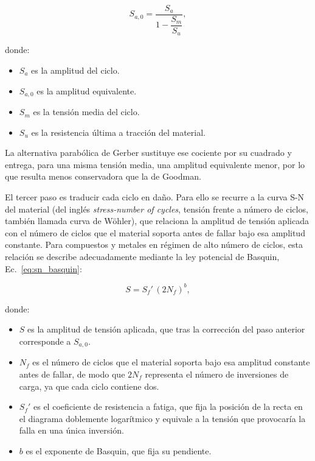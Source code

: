 \begin{equation}
S_{a,0} = \frac{S_a}{1 - \dfrac{S_m}{S_u}},
\label{eq:goodman}
\end{equation}

donde:
\begin{itemize}
    \item $S_a$ es la amplitud del ciclo.
    \item $S_{a,0}$ es la amplitud equivalente.
    \item $S_m$ es la tensión media del ciclo.
    \item $S_u$ es la resistencia última a tracción del material.
\end{itemize}

La alternativa parabólica de Gerber sustituye ese cociente por su cuadrado y entrega, para una misma tensión media, una amplitud equivalente menor, por lo que resulta menos conservadora que la de Goodman.

El tercer paso es traducir cada ciclo en daño. Para ello se recurre a la curva S-N del material (del inglés \textit{stress-number of cycles}, tensión frente a número de ciclos, también llamada curva de Wöhler), que relaciona la amplitud de tensión aplicada con el número de ciclos que el material soporta antes de fallar bajo esa amplitud constante. Para compuestos y metales en régimen de alto número de ciclos, esta relación se describe adecuadamente mediante la ley potencial de Basquin, Ec.~\ref{eq:sn_basquin}:

\begin{equation}
S = S_f' \, (2N_f)^b,
\label{eq:sn_basquin}
\end{equation}

donde:
\begin{itemize}
    \item $S$ es la amplitud de tensión aplicada, que tras la corrección del paso anterior corresponde a $S_{a,0}$.
    \item $N_f$ es el número de ciclos que el material soporta bajo esa amplitud constante antes de fallar, de modo que $2N_f$ representa el número de inversiones de carga, ya que cada ciclo contiene dos.
    \item $S_f'$ es el coeficiente de resistencia a fatiga, que fija la posición de la recta en el diagrama doblemente logarítmico y equivale a la tensión que provocaría la falla en una única inversión.
    \item $b$ es el exponente de Basquin, que fija su pendiente.
\end{itemize}

